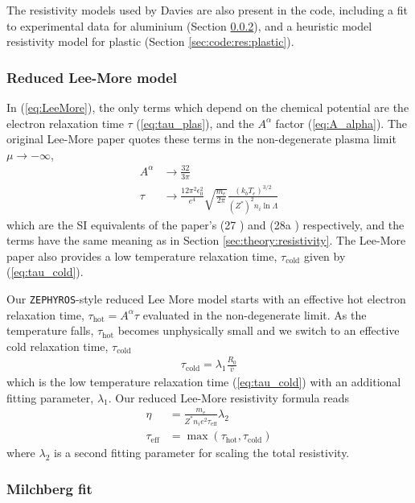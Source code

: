\documentclass[12pt]{article}
\numberwithin{equation}{section}
\begin{document}
The resistivity models used by Davies \cite{hybrid:Davies:2002} are also present in the code, including a fit to experimental data for aluminium (Section \ref{sec:code:res:Milch}), and a heuristic model resistivity model for plastic (Section \ref{sec:code:res:plastic}).

\subsubsection{Reduced Lee-More model} \label{sec:code:res:rlm}

In (\ref{eq:LeeMore}), the only terms which depend on the chemical potential are the electron relaxation time $\tau$ (\ref{eq:tau_plas}), and the $A^\alpha$ factor (\ref{eq:A_alpha}). The original Lee-More paper \cite{eta:LeeMore} quotes these terms in the non-degenerate plasma limit $\mu\rightarrow - \infty$,
%
\begin{align}
  A^{\alpha} &\rightarrow \frac{32}{3\pi} \\
  \tau &\rightarrow \frac{12\pi^2\epsilon_0^2}{e^4}\sqrt{\frac{m_e}{2\pi}}\frac{(k_bT_e)^{3/2}}{(Z^*)^2n_i\ln\Lambda}   
\end{align}
%
which are the SI equivalents of the paper's (27 \cite{eta:LeeMore}) and (28a \cite{eta:LeeMore}) respectively, and the terms have the same meaning as in Section \ref{sec:theory:resistivity}. The Lee-More paper also provides a low temperature relaxation time, $\tau_\text{cold}$ given by (\ref{eq:tau_cold}). 

Our \texttt{ZEPHYROS}-style reduced Lee More model starts with an effective hot electron relaxation time, $\tau_\text{hot} = A^{\alpha}\tau$ evaluated in the non-degenerate limit. As the temperature falls, $\tau_\text{hot}$ becomes unphysically small and we switch to an effective cold relaxation time, $\tau_\text{cold}$
%
\begin{align}
  \tau_\text{cold} = \lambda_1 \frac{R_0}{\bar{v}}
\end{align}
%
which is the low temperature relaxation time (\ref{eq:tau_cold}) with an additional fitting parameter, $\lambda_1$. Our reduced Lee-More resistivity formula reads
%
\begin{align}
  \eta &= \frac{m_e}{Z^*n_i e^2 \tau_\text{eff}} \lambda_2 \\
  \tau_\text{eff} &= \max(\tau_\text{hot}, \tau_\text{cold})
\end{align}
%
where $\lambda_2$ is a second fitting parameter for scaling the total resistivity.

\subsubsection{Milchberg fit} \label{sec:code:res:Milch}
\end{document}
